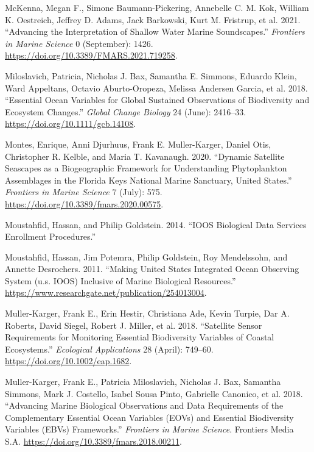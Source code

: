 \documentclass[
]{book}
\newlength{\cslhangindent}
\newlength{\cslentryspacingunit} %
\newenvironment{CSLReferences}[2] %
 {%
  \setlength{\parindent}{0pt}
  \ifodd #1
  \let\oldpar\par
  \def\par{\hangindent=\cslhangindent\oldpar}
  \fi
  \setlength{\parskip}{#2\cslentryspacingunit}
 }%
 {}
\begin{document}
\begin{CSLReferences}{1}{0}
\leavevmode{}%
McKenna, Megan F., Simone Baumann-Pickering, Annebelle C. M. Kok, William K. Oestreich, Jeffrey D. Adams, Jack Barkowski, Kurt M. Fristrup, et al. 2021. {``Advancing the Interpretation of Shallow Water Marine Soundscapes.''} \emph{Frontiers in Marine Science} 0 (September): 1426. \url{https://doi.org/10.3389/FMARS.2021.719258}.

\leavevmode{}%
Miloslavich, Patricia, Nicholas J. Bax, Samantha E. Simmons, Eduardo Klein, Ward Appeltans, Octavio Aburto-Oropeza, Melissa Andersen Garcia, et al. 2018. {``Essential Ocean Variables for Global Sustained Observations of Biodiversity and Ecosystem Changes.''} \emph{Global Change Biology} 24 (June): 2416--33. \url{https://doi.org/10.1111/gcb.14108}.

\leavevmode{}%
Montes, Enrique, Anni Djurhuus, Frank E. Muller-Karger, Daniel Otis, Christopher R. Kelble, and Maria T. Kavanaugh. 2020. {``Dynamic Satellite Seascapes as a Biogeographic Framework for Understanding Phytoplankton Assemblages in the Florida Keys National Marine Sanctuary, United States.''} \emph{Frontiers in Marine Science} 7 (July): 575. \url{https://doi.org/10.3389/fmars.2020.00575}.

\leavevmode{}%
Moustahfid, Hassan, and Philip Goldstein. 2014. {``IOOS Biological Data Services Enrollment Procedures.''}

\leavevmode{}%
Moustahfid, Hassan, Jim Potemra, Philip Goldstein, Roy Mendelssohn, and Annette Desrochers. 2011. {``Making United States Integrated Ocean Observing System (u.s. IOOS) Inclusive of Marine Biological Resources.''} \url{https://www.researchgate.net/publication/254013004}.

\leavevmode{}%
Muller-Karger, Frank E., Erin Hestir, Christiana Ade, Kevin Turpie, Dar A. Roberts, David Siegel, Robert J. Miller, et al. 2018. {``Satellite Sensor Requirements for Monitoring Essential Biodiversity Variables of Coastal Ecosystems.''} \emph{Ecological Applications} 28 (April): 749--60. \url{https://doi.org/10.1002/eap.1682}.

\leavevmode{}%
Muller-Karger, Frank E., Patricia Miloslavich, Nicholas J. Bax, Samantha Simmons, Mark J. Costello, Isabel Sousa Pinto, Gabrielle Canonico, et al. 2018. {``Advancing Marine Biological Observations and Data Requirements of the Complementary Essential Ocean Variables (EOVs) and Essential Biodiversity Variables (EBVs) Frameworks.''} \emph{Frontiers in Marine Science}. Frontiers Media S.A. \url{https://doi.org/10.3389/fmars.2018.00211}.


\end{CSLReferences}
\end{document}
